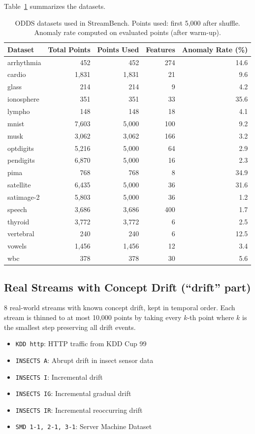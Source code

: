 \documentclass[11pt,a4paper]{article}
\begin{document}
Table~\ref{tab:odds_datasets} summarizes the datasets.

\begin{table}[htbp]
\centering
\caption{ODDS datasets used in StreamBench. Points used: first 5,000 after shuffle. Anomaly rate computed on evaluated points (after warm-up).}
\label{tab:odds_datasets}
\begin{tabular}{lrrrr}
\toprule
Dataset & Total Points & Points Used & Features & Anomaly Rate (\%) \\
\midrule
arrhythmia & 452 & 452 & 274 & 14.6 \\
cardio & 1,831 & 1,831 & 21 & 9.6 \\
glass & 214 & 214 & 9 & 4.2 \\
ionosphere & 351 & 351 & 33 & 35.6 \\
lympho & 148 & 148 & 18 & 4.1 \\
mnist & 7,603 & 5,000 & 100 & 9.2 \\
musk & 3,062 & 3,062 & 166 & 3.2 \\
optdigits & 5,216 & 5,000 & 64 & 2.9 \\
pendigits & 6,870 & 5,000 & 16 & 2.3 \\
pima & 768 & 768 & 8 & 34.9 \\
satellite & 6,435 & 5,000 & 36 & 31.6 \\
satimage-2 & 5,803 & 5,000 & 36 & 1.2 \\
speech & 3,686 & 3,686 & 400 & 1.7 \\
thyroid & 3,772 & 3,772 & 6 & 2.5 \\
vertebral & 240 & 240 & 6 & 12.5 \\
vowels & 1,456 & 1,456 & 12 & 3.4 \\
wbc & 378 & 378 & 30 & 5.6 \\
\bottomrule
\end{tabular}
\end{table}

\subsection{Real Streams with Concept Drift (``drift'' part)}
\label{sec:drift}

8 real-world streams with known concept drift, kept in temporal order. Each stream is thinned to at most 10,000 points by taking every $k$-th point where $k$ is the smallest step preserving all drift events.

\begin{itemize}
    \item \texttt{KDD http}: HTTP traffic from KDD Cup 99 \citep{kddcup99}
    \item \texttt{INSECTS A}: Abrupt drift in insect sensor data \citep{insects}
    \item \texttt{INSECTS I}: Incremental drift
    \item \texttt{INSECTS IG}: Incremental gradual drift
    \item \texttt{INSECTS IR}: Incremental reoccurring drift
    \item \texttt{SMD 1-1, 2-1, 3-1}: Server Machine Dataset \citep{su2019robust}
\end{itemize}
\end{document}
